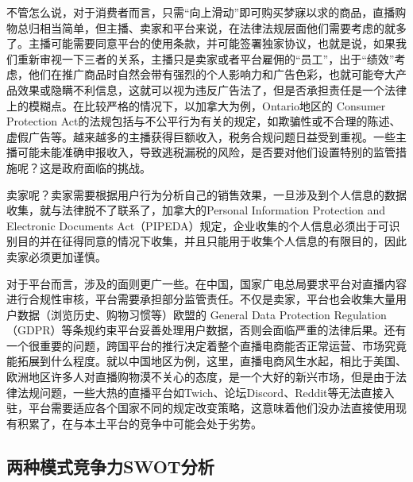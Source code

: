 \documentclass[12pt]{ctexart}
\begin{document}
不管怎么说，对于消费者而言，只需“向上滑动”即可购买梦寐以求的商品，直播购物总归相当简单，但主播、卖家和平台来说，在法律法规层面他们需要考虑的就多了。主播可能需要同意平台的使用条款，并可能签署独家协议\cite{25}，也就是说，如果我们重新审视一下三者的关系，主播只是卖家或者平台雇佣的“员工”，出于“绩效”考虑，他们在推广商品时自然会带有强烈的个人影响力和广告色彩，也就可能夸大产品效果或隐瞒不利信息，这就可以视为违反广告法了，但是否承担责任是一个法律上的模糊点。在比较严格的情况下，以加拿大为例，Ontario地区的 Consumer Protection Act的法规包括与不公平行为有关的规定，如欺骗性或不合理的陈述、虚假广告等\cite{25}。越来越多的主播获得巨额收入，税务合规问题日益受到重视。一些主播可能未能准确申报收入，导致逃税漏税的风险，是否要对他们设置特别的监管措施呢？这是政府面临的挑战。

卖家呢？卖家需要根据用户行为分析自己的销售效果，一旦涉及到个人信息的数据收集，就与法律脱不了联系了，加拿大的Personal Information Protection and Electronic Documents Act（PIPEDA）规定，企业收集的个人信息必须出于可识别目的并在征得同意的情况下收集，并且只能用于收集个人信息的有限目的，因此卖家必须更加谨慎。

对于平台而言，涉及的面则更广一些。在中国，国家广电总局要求平台对直播内容进行合规性审核，平台需要承担部分监管责任。不仅是卖家，平台也会收集大量用户数据（浏览历史、购物习惯等）欧盟的 General Data Protection Regulation（GDPR）等条规约束平台妥善处理用户数据，否则会面临严重的法律后果。还有一个很重要的问题，跨国平台的推行决定着整个直播电商能否正常运营、市场究竟能拓展到什么程度。就以中国地区为例，这里，直播电商风生水起，相比于美国、欧洲地区许多人对直播购物漠不关心的态度，是一个大好的新兴市场，但是由于法律法规问题，一些大热的直播平台如Twich、论坛Discord、Reddit等无法直接入驻，平台需要适应各个国家不同的规定改变策略，这意味着他们没办法直接使用现有积累了，在与本土平台的竞争中可能会处于劣势。

\subsection{两种模式竞争力SWOT分析}
\end{document}
